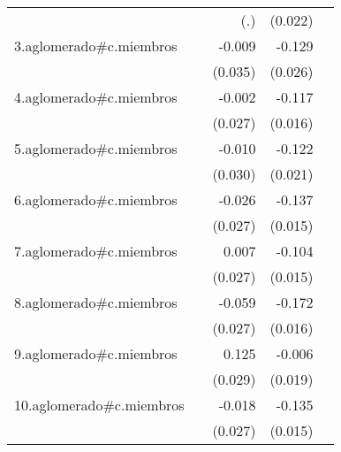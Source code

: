 {\begin{longtable}{l*{4}{D{.}{.}{-1}}}
            &                     &         (.)         &     (0.022)         &                     \\
\addlinespace
3.aglomerado#c.miembros&                     &      -0.009         &      -0.129\sym{***}&                     \\
            &                     &     (0.035)         &     (0.026)         &                     \\
\addlinespace
4.aglomerado#c.miembros&                     &      -0.002         &      -0.117\sym{***}&                     \\
            &                     &     (0.027)         &     (0.016)         &                     \\
\addlinespace
5.aglomerado#c.miembros&                     &      -0.010         &      -0.122\sym{***}&                     \\
            &                     &     (0.030)         &     (0.021)         &                     \\
\addlinespace
6.aglomerado#c.miembros&                     &      -0.026         &      -0.137\sym{***}&                     \\
            &                     &     (0.027)         &     (0.015)         &                     \\
\addlinespace
7.aglomerado#c.miembros&                     &       0.007         &      -0.104\sym{***}&                     \\
            &                     &     (0.027)         &     (0.015)         &                     \\
\addlinespace
8.aglomerado#c.miembros&                     &      -0.059\sym{*}  &      -0.172\sym{***}&                     \\
            &                     &     (0.027)         &     (0.016)         &                     \\
\addlinespace
9.aglomerado#c.miembros&                     &       0.125\sym{***}&      -0.006         &                     \\
            &                     &     (0.029)         &     (0.019)         &                     \\
\addlinespace
10.aglomerado#c.miembros&                     &      -0.018         &      -0.135\sym{***}&                     \\
            &                     &     (0.027)         &     (0.015)         &                     \\

\end{longtable}}
